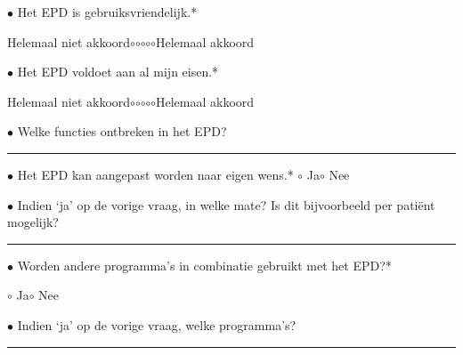     \noindent \(\bullet\) Het EPD is gebruiksvriendelijk.*
    \vspace{-6pt}
    \begin{center}
    Helemaal niet akkoord\hspace{10pt}\(\circ\)\hspace{20pt}\(\circ\)\hspace{20pt}\(\circ\)\hspace{20pt}\(\circ\)\hspace{20pt}\(\circ\)\hspace{10pt}Helemaal akkoord
    \end{center}

    \noindent \(\bullet\) Het EPD voldoet aan al mijn eisen.*
    \vspace{-6pt}
    \begin{center}
    Helemaal niet akkoord\hspace{10pt}\(\circ\)\hspace{20pt}\(\circ\)\hspace{20pt}\(\circ\)\hspace{20pt}\(\circ\)\hspace{20pt}\(\circ\)\hspace{10pt}Helemaal akkoord
    \end{center}

    \noindent \(\bullet\) Welke functies ontbreken in het EPD?\hspace{6pt}\rule{0.2\textwidth}{0.4pt}\medskip

    \noindent \(\bullet\) Het EPD kan aangepast worden naar eigen wens.*\hspace{10pt} \(\circ\) Ja\hspace{10pt}\(\circ\) Nee\medskip

    \noindent \(\bullet\) Indien `ja' op de vorige vraag, in welke mate? Is dit bijvoorbeeld per pati\"{e}nt\newline
    \hspace*{9pt}mogelijk?\hspace{6pt}\rule{0.3\textwidth}{0.4pt}\medskip

    \noindent \(\bullet\) Worden andere programma's in combinatie gebruikt met het EPD?*
    \vspace{-6pt}
    \begin{center}
        \(\circ\) Ja\hspace{10pt}\(\circ\) Nee
    \end{center}

    \noindent \(\bullet\) Indien `ja' op de vorige vraag, welke programma's?\hspace{6pt}\rule{0.2\textwidth}{0.4pt}

